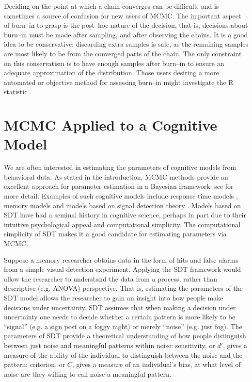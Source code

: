 Deciding on the point at which a chain converges can be difficult, and is sometimes a source of confusion for new users of MCMC. The important aspect of burn--in to grasp is the post--hoc nature of the decision, that is, decisions about burn--in must be made after sampling, and after observing the chains. It is a good idea to be conservative: discarding extra samples is safe, as the remaining samples are most likely to be from the converged parts of the chain. The only constraint on this conservatism is to have enough samples after burn--in to ensure an adequate approximation of the distribution. Those users desiring a more automated or objective method for assessing burn--in might investigate the \^R statistic \cite{GelmanRubin1992}.


\section{MCMC Applied to a Cognitive Model}

We are often interested in estimating the parameters of cognitive models from behavioral data. As stated in the introduction, MCMC methods provide an excellent approach for parameter estimation in a Bayesian framework: see  for more detail. Examples of such cognitive models include response time models \cite{BrownHeathcote2008, Ratcliff1978, VandekerckhoveEtAl2011}, memory models \cite{HemmerSteyvers2009, ShiffrinSteyvers1997, VickersLee1997} and models based on signal detection theory \cite<SDT:>{GreenSwets1966}. Models based on SDT have had a seminal history in cognitive science, perhaps in part due to their intuitive psychological appeal and computational simplicity. The computational simplicity of SDT makes it a good candidate for estimating parameters via MCMC.

Suppose a memory researcher obtains data in the form of hits and false alarms from a simple visual detection experiment. Applying the SDT framework would allow the researcher to understand the data from a process, rather than descriptive (e.g. ANOVA) perspective. That is, estimating the parameters of the SDT model allows the researcher to gain an insight into how people make decisions under uncertainty. SDT assumes that when making a decision under uncertainty one needs to decide whether a certain pattern is more likely to be ``signal'' (e.g. a sign post on a foggy night) or merely ``noise'' (e.g. just fog). The parameters of SDT provide a theoretical understanding of how people distinguish between just noise and meaningful patterns within noise: sensitivity, or $d'$, gives a measure of the ability of the individual to distinguish between the noise and the pattern; criterion, or $C$, gives a measure of an individual's bias, at what level of noise are they willing to call noise a meaningful pattern.

